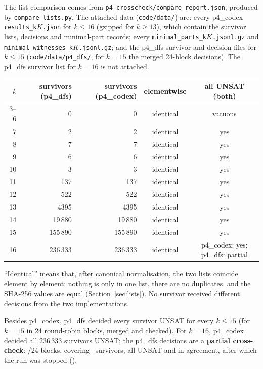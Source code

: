 \documentclass[11pt]{article}
\theoremstyle{definition}
\theoremstyle{remark}
\begin{document}
{\sloppy\noindent The list comparison comes from \texttt{p4\_crosscheck/compare\_report.json}, produced by
\texttt{compare\_lists.py}. The attached data (\texttt{code/data/}) are: every p4\_codex
\texttt{results\_k$K$.json} for $k\le16$ (gzipped for $k\ge13$), which contain the survivor
lists, decisions and minimal-part records; every \texttt{minimal\_parts\_k$K$.jsonl.gz} and
\texttt{minimal\_witnesses\_k$K$.jsonl.gz}; and the p4\_dfs survivor and decision files for
$k\le15$ (\texttt{code/data/p4\_dfs/}, for $k=15$ the merged 24-block decisions). The p4\_dfs
survivor list for $k=16$ is not attached.\par}
\begin{center}
\begin{tabular}{r|r|r|c|c}
$k$ & survivors (p4\_dfs) & survivors (p4\_codex) & elementwise & all UNSAT (both)\\ \hline
3--6 & 0 & 0 & identical & vacuous\\
7 & 2 & 2 & identical & yes\\
8 & 7 & 7 & identical & yes\\
9 & 6 & 6 & identical & yes\\
10 & 3 & 3 & identical & yes\\
11 & 137 & 137 & identical & yes\\
12 & 522 & 522 & identical & yes\\
13 & 4395 & 4395 & identical & yes\\
14 & 19\,880 & 19\,880 & identical & yes\\
15 & 155\,890 & 155\,890 & identical & yes\\
16 & 236\,333 & 236\,333 & identical & p4\_codex: yes; p4\_dfs: partial
\end{tabular}
\end{center}
``Identical'' means that, after canonical normalisation, the two lists coincide element by element:
nothing is only in one list, there are no duplicates, and the SHA-256 values are equal
(Section~\ref{sec:lists}). No survivor received different decisions from the two
implementations.

Besides p4\_codex, p4\_dfs decided every survivor UNSAT for every $k\le15$ (for $k=15$ in 24
round-robin blocks, merged and checked). For $k=16$, p4\_codex decided all $236\,333$ survivors
UNSAT; the p4\_dfs decisions are a \textbf{partial cross-check}: \kXVIblocks/24 blocks, covering
\kXVIdecided\ survivors, all UNSAT and in agreement, after which the run was stopped
(\kXVIstamp).
\end{document}
